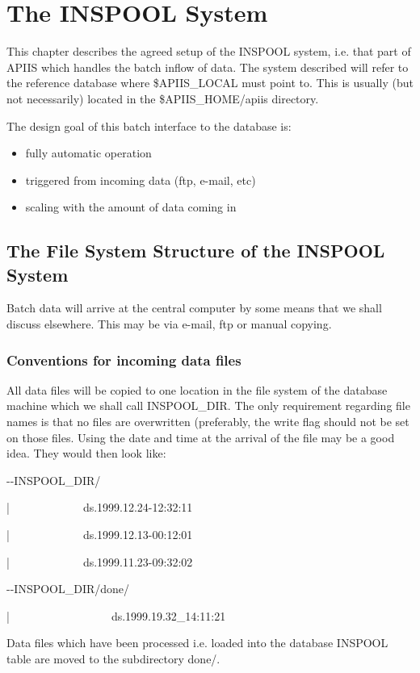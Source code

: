 \chapter{The INSPOOL System}

This chapter describes the agreed setup of the INSPOOL system, i.e.
that part of APIIS which handles the batch inflow of data. The system
described will refer to the reference database where \$APIIS\_LOCAL
must point to. This is usually (but not necessarily) located in the
\$APIIS\_HOME/apiis directory. 

The design goal of this batch interface to the database is:

\begin{itemize}
\item fully automatic operation
\item triggered from incoming data (ftp, e-mail, etc)
\item scaling with the amount of data coming in
\end{itemize}

\section{The File System Structure of the INSPOOL System}

Batch data will arrive at the central computer by some means that
we shall discuss elsewhere. This may be via e-mail, ftp or manual
copying.


\subsection{Conventions for incoming data files}

All data files will be copied to one location in the file system of
the database machine which we shall call INSPOOL\_DIR. The only requirement
regarding file names is that no files are overwritten (preferably,
the write flag should not be set on those files. Using the date and
time at the arrival of the file may be a good idea. They would then
look like:

\begin{lyxcode}
{\footnotesize -{}-INSPOOL\_DIR/}{\footnotesize \par}

{\footnotesize |~~~~~~~~~~~~~ds.1999.12.24-12:32:11}{\footnotesize \par}

{\footnotesize |~~~~~~~~~~~~~ds.1999.12.13-00:12:01}{\footnotesize \par}

{\footnotesize |~~~~~~~~~~~~~ds.1999.11.23-09:32:02}{\footnotesize \par}

{\footnotesize -{}-INSPOOL\_DIR/done/~}{\footnotesize \par}

{\footnotesize |~~~~~~~~~~~~~~~~~~ds.1999.19.32\_14:11:21}{\footnotesize \par}


\end{lyxcode}
Data files which have been processed i.e. loaded into the database
INSPOOL table are moved to the subdirectory done/.

